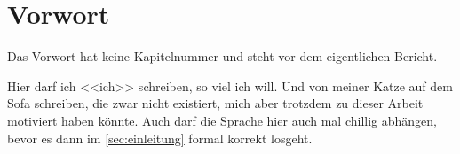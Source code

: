 \chapter*{Vorwort}
Das Vorwort hat keine Kapitelnummer und steht vor dem eigentlichen Bericht.

Hier darf ich <<ich>> schreiben, so viel ich will. Und von meiner Katze auf dem
Sofa schreiben, die zwar nicht existiert, mich aber trotzdem zu dieser Arbeit
motiviert haben könnte. Auch darf die Sprache hier auch mal chillig abhängen,
bevor es dann im \autoref{sec:einleitung} formal korrekt losgeht.
